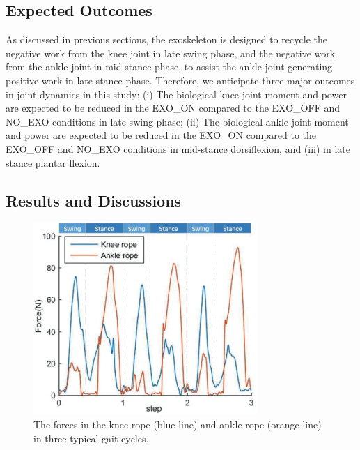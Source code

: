 \documentclass[twocolumn,cleanfoot,10pt]{asme2ej}
\begin{document}
\subsection{Expected Outcomes}

As discussed in previous sections, the exoskeleton is designed to recycle the negative work from the knee joint in late swing phase, and the negative work from the ankle joint in mid-stance phase, to assist the ankle joint generating positive work in late stance phase.
Therefore, we anticipate three major outcomes in joint dynamics in this study:
(i) The biological knee joint moment and power are expected to be reduced in the EXO\_ON compared to the EXO\_OFF and NO\_EXO conditions in late swing phase;
(ii) The biological ankle joint moment and power are expected to be reduced in the EXO\_ON compared to the EXO\_OFF and NO\_EXO conditions in mid-stance dorsiflexion, and (iii) in late stance plantar flexion.

\subsection{Results and Discussions}

\begin{figure}[b]
	\centering
	\includegraphics[width=8.5cm]{forces.eps}
	\caption{The forces in the knee rope (blue line) and ankle rope (orange line) in three typical gait cycles.}
	\label{fig:force}
\end{figure}
\end{document}
